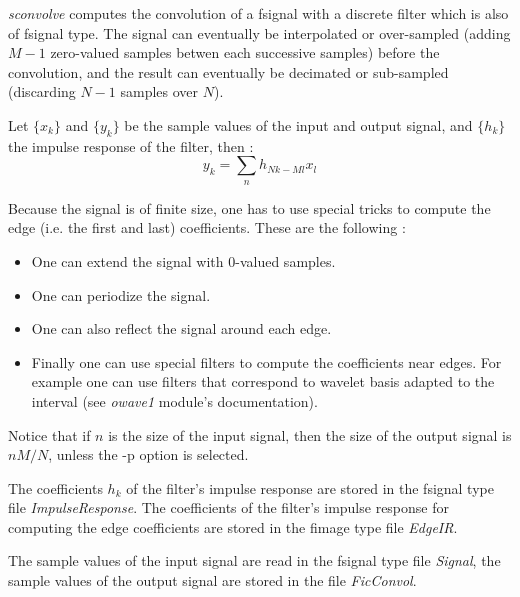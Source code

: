 {\em sconvolve} computes the convolution of a fsignal with a discrete filter which is also of fsignal type. 
The signal can eventually be interpolated or over-sampled (adding $M-1$ zero-valued samples betwen each successive samples) before the convolution, and the result can eventually be decimated or sub-sampled (discarding $N-1$ samples over $N$).

Let $\{x_{k}\}$ and $\{y_{k}\}$ be the sample values of the input and output signal, and $\{h_{k}\}$ the impulse response of the filter, then :
\[
y_{k} = \sum_{n} h_{Nk-Ml} x_{l}
\]

Because the signal is of finite size, one has to use special tricks to compute the edge (i.e. the first and last) coefficients. These are the following :
\begin{itemize}
\item
One can extend the signal with \( 0 \)-valued samples.
\item
One can periodize the signal.
\item
One can also reflect the signal around each edge.
\item
Finally one can use special filters to compute the coefficients near edges. For example one can use filters that correspond to wavelet basis adapted to the interval (see {\em owave1} module's documentation). 
\end{itemize}

Notice that if $n$ is the size of the input signal, then the size of the output signal is $nM/N$, unless the -p option is selected.

The coefficients \( h_{k} \) of the filter's impulse response are stored in the fsignal type file {\em ImpulseResponse}. The coefficients of the filter's impulse response for computing the edge coefficients are stored in the fimage type file {\em EdgeIR}.

The sample values of the input signal are read in the fsignal type file {\em Signal}, the sample values of the output signal are stored in the file {\em FicConvol}.

